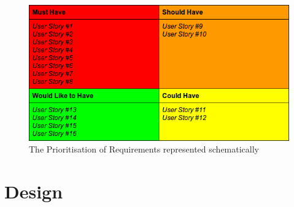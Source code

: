 \documentclass{l3proj}
\begin{document}
{
\begin{figure}[h]
\caption{The Prioritisation of Requirements represented schematically}
\centering
\includegraphics[scale=0.5]{Prioritisation.png}
\end{figure}
}

\chapter{Design}
\label{design}

\end{document}
